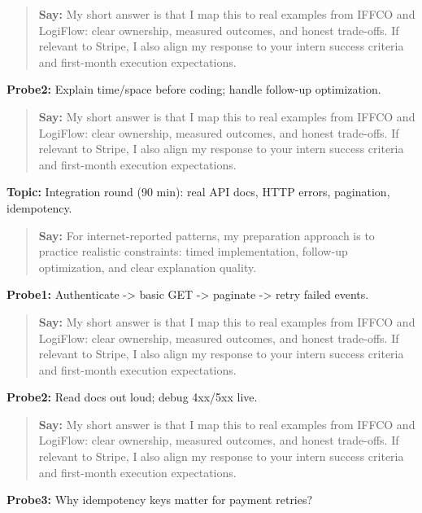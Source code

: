 \documentclass[9pt,a4paper]{article}
\begin{document}
\begin{quote}\small\textbf{Say:} My short answer is that I map this to real examples from IFFCO and LogiFlow: clear ownership, measured outcomes, and honest trade-offs. If relevant to Stripe, I also align my response to your intern success criteria and first-month execution expectations.\end{quote}
\vspace{2mm}
\textbf{Probe2:} Explain time/space before coding; handle follow-up optimization.

\begin{quote}\small\textbf{Say:} My short answer is that I map this to real examples from IFFCO and LogiFlow: clear ownership, measured outcomes, and honest trade-offs. If relevant to Stripe, I also align my response to your intern success criteria and first-month execution expectations.\end{quote}
\vspace{2mm}
\textbf{Topic:} Integration round (90 min): real API docs, HTTP errors, pagination, idempotency.

\begin{quote}\small\textbf{Say:} For internet-reported patterns, my preparation approach is to practice realistic constraints: timed implementation, follow-up optimization, and clear explanation quality.\end{quote}
\vspace{2mm}
\textbf{Probe1:} Authenticate -> basic GET -> paginate -> retry failed events.

\begin{quote}\small\textbf{Say:} My short answer is that I map this to real examples from IFFCO and LogiFlow: clear ownership, measured outcomes, and honest trade-offs. If relevant to Stripe, I also align my response to your intern success criteria and first-month execution expectations.\end{quote}
\vspace{2mm}
\textbf{Probe2:} Read docs out loud; debug 4xx/5xx live.

\begin{quote}\small\textbf{Say:} My short answer is that I map this to real examples from IFFCO and LogiFlow: clear ownership, measured outcomes, and honest trade-offs. If relevant to Stripe, I also align my response to your intern success criteria and first-month execution expectations.\end{quote}
\vspace{2mm}
\textbf{Probe3:} Why idempotency keys matter for payment retries?
\end{document}
